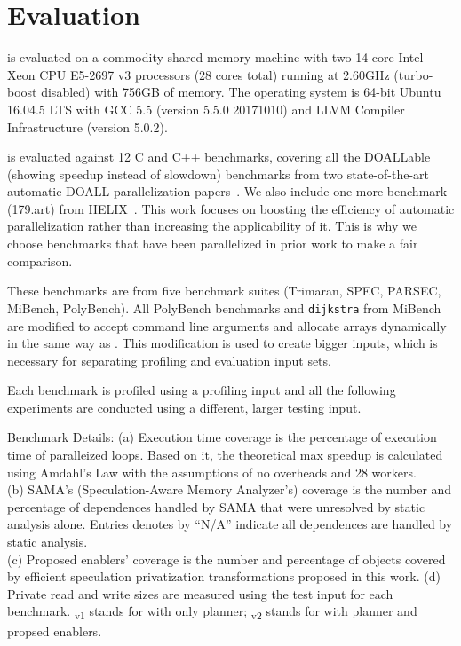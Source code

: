 \section{Evaluation}

\name is evaluated on a commodity shared-memory machine with two 14-core
Intel Xeon CPU E5-2697 v3 processors (28 cores total) running at 2.60GHz
(turbo-boost disabled) with 756GB of memory. The operating system is 64-bit
Ubuntu 16.04.5 LTS with GCC 5.5 (version 5.5.0 20171010) and LLVM Compiler
Infrastructure (version 5.0.2).


\name is evaluated against 12 C and C++ benchmarks, covering all the
DOALLable (showing speedup instead of slowdown) benchmarks from two
state-of-the-art automatic DOALL parallelization
papers~\cite{johnson:12:pldi,kim:12:cgo}. We also include one more
benchmark (179.art) from HELIX~\cite{simone:12:cgo}.
This work focuses on boosting the efficiency of automatic
parallelization rather than increasing the applicability of it. This is
why we choose benchmarks that have been parallelized in prior work to
make a fair comparison.

These benchmarks are from five benchmark suites
(Trimaran\cite{trimaran:web}, SPEC\cite{}, PARSEC\cite{bienia:08:parsec},
MiBench\cite{guthaus:2001:iiwsc}, PolyBench\cite{}). All PolyBench benchmarks and
\texttt{dijkstra} from MiBench are modified to accept command line
arguments and allocate arrays dynamically in the same way as
\cite{kim:12:cgo}. This modification is used to create bigger inputs, which
is necessary for separating profiling and evaluation input sets.

%
Each benchmark is profiled using a profiling input and all the following
experiments are conducted using a different, larger testing input.

\begin{table}[h]
  
  \caption{
    Benchmark Details: (a) Execution time coverage is the percentage of
  execution time of paralleized loops. Based on it, the theoretical max
  speedup is calculated using Amdahl's Law with the assumptions of no
  overheads and 28 workers. \\(b) SAMA's (Speculation-Aware Memory
  Analyzer's) coverage is the number and percentage of dependences handled
  by SAMA that were unresolved by static analysis alone. Entries denotes by
  ``N/A'' indicate all dependences are handled by static analysis. \\(c)
  Proposed enablers’ coverage is the number and percentage of objects
  covered by efficient speculation privatization transformations proposed
  in this work. (d) Private read and write sizes are measured using the
  test input for each benchmark. \namensp\textsubscript{v1} stands for
  \name with only planner; \namensp\textsubscript{v2} stands for \name with
  planner and propsed enablers.}
  \label{tab:benchmark-list}
    \vspace{-5pt}
\end{table}

